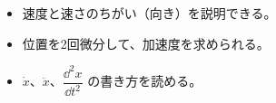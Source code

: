 
\begin{goal}
\begin{itemize}[label={\color{bkTheme}●}, leftmargin=1.6\zw, itemsep=0pt, topsep=1pt]
\item {}\enspace 速度と速さのちがい（向き）を説明できる。
\item {}\enspace 位置を2回微分して、加速度を求められる。
\item {}\enspace $\dot{x}$、$\ddot{x}$、$\dfrac{\dd^2x}{\dd t^2}$ の書き方を読める。
\end{itemize}
\end{goal}

